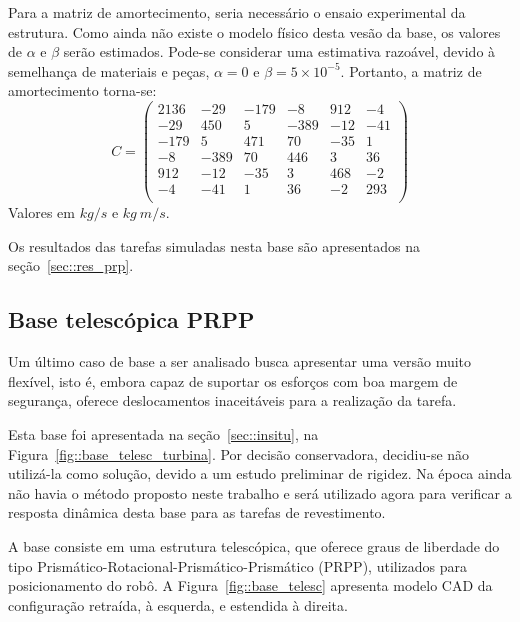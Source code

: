 Para a matriz de amortecimento, seria necessário o ensaio experimental da
estrutura. Como ainda não existe o modelo físico desta vesão da base, os valores
de $\alpha$ e $\beta$ serão estimados. Pode-se considerar uma estimativa
razoável, devido à semelhança de materiais e peças, $\alpha = 0$ e $\beta = 5
\times 10^{-5}$. Portanto, a matriz de amortecimento torna-se:
%
\begin{equation}
	C = 
\begin{pmatrix}
2136	&	-29		&	-179	&	-8		&	912		&	-4 	\\
-29		&	450 	&	5		&	-389	&	-12		&	-41 \\
-179	&	5		&	471		&	70		&	-35		&	1 	\\
-8		&	-389	&	70		&	446		&	3		&	36	\\
912		&	-12		&	-35		&	3		&	468		&	-2	\\
-4		&	-41		&	1		&	36		&	-2		&	293	\\
\end{pmatrix}
\end{equation}
%
Valores em $kg/s$ e $kg~m/s$.

Os resultados das tarefas simuladas nesta base são apresentados na
seção~\ref{sec::res_prp}.



\subsection{Base telescópica PRPP} \label{sec::base_prpp}

Um último caso de base a ser analisado busca apresentar uma versão muito
flexível, isto é, embora capaz de suportar os esforços com boa margem de
segurança, oferece deslocamentos inaceitáveis para a realização da tarefa.

Esta base foi apresentada na seção~\ref{sec::insitu}, na
Figura~\ref{fig::base_telesc_turbina}. Por decisão conservadora, decidiu-se não
utilizá-la como solução, devido a um estudo preliminar de rigidez. Na época
ainda não havia o método proposto neste trabalho e será utilizado agora para
verificar a resposta dinâmica desta base para as tarefas de revestimento.

A base consiste em uma estrutura telescópica, que oferece graus de liberdade do
tipo Prismático-Rotacional-Prismático-Prismático (PRPP), utilizados para
posicionamento do robô.
A Figura~\ref{fig::base_telesc} apresenta modelo CAD da configuração retraída, à
esquerda, e estendida à direita.

